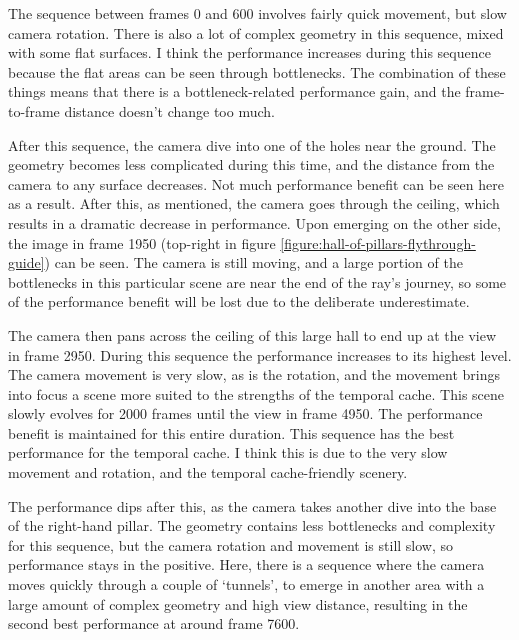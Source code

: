 The sequence between frames 0 and 600 involves fairly quick movement, but slow camera rotation. There is also a lot of complex geometry in this sequence, mixed with some flat surfaces. I think the performance increases during this sequence because the flat areas can be seen through bottlenecks. The combination of these things means that there is a bottleneck-related performance gain, and the frame-to-frame distance doesn't change too much.\newline

After this sequence, the camera dive into one of the holes near the ground. The geometry becomes less complicated during this time, and the distance from the camera to any surface decreases. Not much performance benefit can be seen here as a result. After this, as mentioned, the camera goes through the ceiling, which results in a dramatic decrease in performance. Upon emerging on the other side, the image in frame 1950 (top-right in figure \ref{figure:hall-of-pillars-flythrough-guide}) can be seen. The camera is still moving, and a large portion of the bottlenecks in this particular scene are near the end of the ray's journey, so some of the performance benefit will be lost due to the deliberate underestimate.\newline

The camera then pans across the ceiling of this large hall to end up at the view in frame 2950. During this sequence the performance increases to its highest level. The camera movement is very slow, as is the rotation, and the movement brings into focus a scene more suited to the strengths of the temporal cache. This scene slowly evolves for 2000 frames until the view in frame 4950. The performance benefit is maintained for this entire duration. This sequence has the best performance for the temporal cache. I think this is due to the very slow movement and rotation, and the temporal cache-friendly scenery.\newline

The performance dips after this, as the camera takes another dive into the base of the right-hand pillar. The geometry contains less bottlenecks and complexity for this sequence, but the camera rotation and movement is still slow, so performance stays in the positive. Here, there is a sequence where the camera moves quickly through a couple of `tunnels', to emerge in another area with a large amount of complex geometry and high view distance, resulting in the second best performance at around frame 7600.\newline

